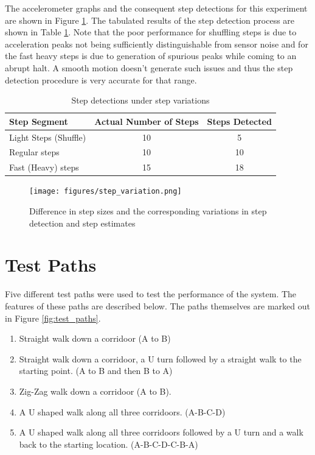 The accelerometer graphs and the consequent step detections for this 
experiment are shown in Figure \ref{fig:step_variation}. The tabulated
results of the step detection process are shown in 
Table \ref{tbl:step_variation}. Note that the poor performance for 
shuffling steps is due to acceleration peaks not being sufficiently 
distinguishable from sensor noise and for the fast heavy steps is 
due to generation of spurious peaks while coming to an abrupt halt.
A smooth motion doesn't generate such issues and thus the step 
detection procedure is very accurate for that range.

\begin{table}[tbph]
    \centering
    \begin{tabular}{|l|c|c|}
        \hline
        \hline
        Step Segment & Actual Number of Steps & Steps Detected \\
        \hline
        Light Steps (Shuffle) & 10 & 5 \\
        Regular steps & 10 & 10 \\
        Fast (Heavy) steps & 15 & 18 \\
        \hline
        \hline
    \end{tabular}
    \caption{Step detections under step variations\label{tbl:step_variation}}
\end{table}

\begin{figure}
    \centering
    \texttt{[image: figures/step\_variation.png]}
    \caption{Difference in step sizes and the corresponding variations in 
        step detection and step estimates\label{fig:step_variation}}
\end{figure}

\section{Test Paths\label{sec:test_paths}}

Five different test paths were used to test the performance of the system.
The features of these paths are described below. The paths themselves
are marked out in Figure \ref{fig:test_paths}.

\begin{enumerate}
\item Straight walk down a corridoor (A to B)
\item Straight walk down a corridoor, a U turn followed by a straight walk 
    to the starting point. (A to B and then B to A)
\item Zig-Zag walk down a corridoor (A to B).
\item A U shaped walk along all three corridoors. (A-B-C-D)
\item A U shaped walk along all three corridoors followed by a U turn and a 
    walk back to the starting location. (A-B-C-D-C-B-A)
\end{enumerate}

